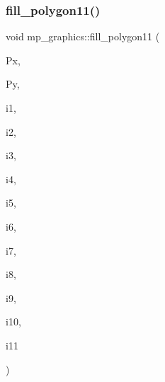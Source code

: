 \subsubsection{\texorpdfstring{fill\+\_\+polygon11()}{fill\_polygon11()}}
{\footnotesize\ttfamily void mp\+\_\+graphics\+::fill\+\_\+polygon11 (\begin{DoxyParamCaption}\item[{\mbox{\hyperlink{galois_8h_a09fddde158a3a20bd2dcadb609de11dc}{I\+NT}} $\ast$}]{Px,  }\item[{\mbox{\hyperlink{galois_8h_a09fddde158a3a20bd2dcadb609de11dc}{I\+NT}} $\ast$}]{Py,  }\item[{\mbox{\hyperlink{galois_8h_a09fddde158a3a20bd2dcadb609de11dc}{I\+NT}}}]{i1,  }\item[{\mbox{\hyperlink{galois_8h_a09fddde158a3a20bd2dcadb609de11dc}{I\+NT}}}]{i2,  }\item[{\mbox{\hyperlink{galois_8h_a09fddde158a3a20bd2dcadb609de11dc}{I\+NT}}}]{i3,  }\item[{\mbox{\hyperlink{galois_8h_a09fddde158a3a20bd2dcadb609de11dc}{I\+NT}}}]{i4,  }\item[{\mbox{\hyperlink{galois_8h_a09fddde158a3a20bd2dcadb609de11dc}{I\+NT}}}]{i5,  }\item[{\mbox{\hyperlink{galois_8h_a09fddde158a3a20bd2dcadb609de11dc}{I\+NT}}}]{i6,  }\item[{\mbox{\hyperlink{galois_8h_a09fddde158a3a20bd2dcadb609de11dc}{I\+NT}}}]{i7,  }\item[{\mbox{\hyperlink{galois_8h_a09fddde158a3a20bd2dcadb609de11dc}{I\+NT}}}]{i8,  }\item[{\mbox{\hyperlink{galois_8h_a09fddde158a3a20bd2dcadb609de11dc}{I\+NT}}}]{i9,  }\item[{\mbox{\hyperlink{galois_8h_a09fddde158a3a20bd2dcadb609de11dc}{I\+NT}}}]{i10,  }\item[{\mbox{\hyperlink{galois_8h_a09fddde158a3a20bd2dcadb609de11dc}{I\+NT}}}]{i11 }\end{DoxyParamCaption})}

\mbox{\label{classmp__graphics_a34e1a9951b2d27c088b8f5f6c2ccf0be}} 
